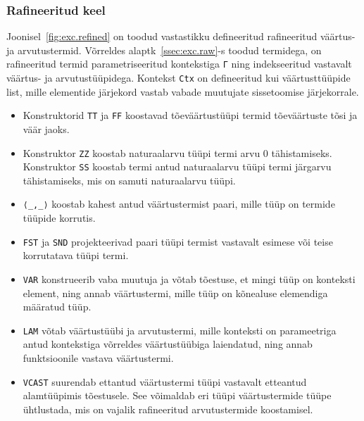 \documentclass[a4paper,12pt]{article}
\begin{document}
\subsubsection{Rafineeritud keel}

Joonisel~\ref{fig:exc.refined} on toodud vastastikku defineeritud rafineeritud väärtus- ja arvutustermid.
Võrreldes alaptk~\ref{ssec:exc.raw}-s toodud termidega, on rafineeritud termid parametriseeritud kontekstiga {\tt Γ} ning indekseeritud vastavalt väärtus- ja arvutustüüpidega.
Kontekst {\tt Ctx} on defineeritud kui väärtusttüüpide list, mille elementide järjekord vastab vabade muutujate sissetoomise järjekorrale.
\begin{itemize}
\item Konstruktorid {\tt TT} ja {\tt FF} koostavad tõeväärtustüüpi termid tõeväärtuste tõsi ja väär jaoks.
\item Konstruktor {\tt ZZ} koostab naturaalarvu tüüpi termi arvu 0 tähistamiseks. Konstruktor {\tt SS} koostab termi antud naturaalarvu tüüpi termi järgarvu tähistamiseks, mis on samuti naturaalarvu tüüpi.
\item {\tt ⟨_,_⟩} koostab kahest antud väärtustermist paari, mille tüüp on termide tüüpide korrutis.
\item {\tt FST} ja {\tt SND} projekteerivad paari tüüpi termist vastavalt esimese või teise korrutatava tüüpi termi.
\item {\tt VAR} konstrueerib vaba muutuja ja võtab tõestuse, et mingi tüüp on konteksti element, ning annab väärtustermi, mille tüüp on kõnealuse elemendiga määratud tüüp.
\item {\tt LAM} võtab väärtustüübi ja arvutustermi, mille konteksti on parameetriga antud kontekstiga võrreldes väärtustüübiga laiendatud, ning annab funktsioonile vastava väärtustermi.
\item {\tt VCAST} suurendab ettantud väärtustermi tüüpi vastavalt etteantud alamtüüpimis tõestusele. See võimaldab eri tüüpi väärtustermide tüüpe ühtlustada, mis on vajalik rafineeritud arvutustermide koostamisel.
\end{itemize}
\end{document}
